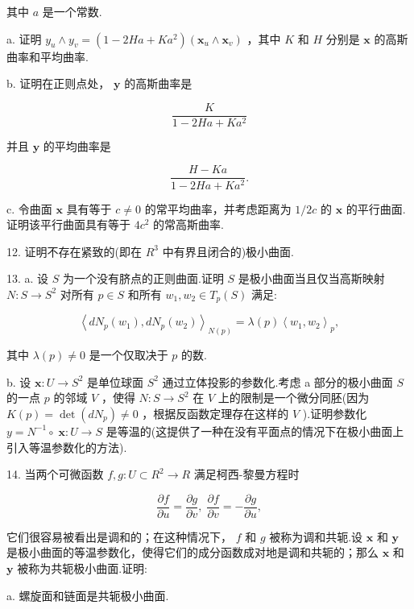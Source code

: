 其中 \(a\) 是一个常数.

a. 证明 \({y}_{u} \land  {y}_{v} = \left( {1 - {2Ha} + K{a}^{2}}\right) \left( {{\mathbf{x}}_{u} \land  {\mathbf{x}}_{v}}\right)\) ，其中 \(K\) 和 \(H\) 分别是 \(\mathbf{x}\) 的高斯曲率和平均曲率.

b. 证明在正则点处， \(\mathbf{y}\) 的高斯曲率是

\[
\frac{K}{1 - {2Ha} + K{a}^{2}}
\]

并且 \(\mathbf{y}\) 的平均曲率是

\[
\frac{H - {Ka}}{1 - {2Ha} + K{a}^{2}}.
\]

c. 令曲面 \(\mathbf{x}\) 具有等于 \(c \neq  0\) 的常平均曲率，并考虑距离为 \(1/{2c}\) 的 \(\mathbf{x}\) 的平行曲面.证明该平行曲面具有等于 \(4{c}^{2}\) 的常高斯曲率.

12. 证明不存在紧致的(即在 \({R}^{3}\) 中有界且闭合的)极小曲面.

13. a. 设 \(S\) 为一个没有脐点的正则曲面.证明 \(S\) 是极小曲面当且仅当高斯映射 \(N : S \rightarrow  {S}^{2}\) 对所有 \(p \in  S\) 和所有 \({w}_{1},{w}_{2} \in  {T}_{p}\left( S\right)\) 满足:

\[
{\left\langle  d{N}_{p}\left( {w}_{1}\right) ,d{N}_{p}\left( {w}_{2}\right) \right\rangle  }_{N\left( p\right) } = \lambda \left( p\right) {\left\langle  {w}_{1},{w}_{2}\right\rangle  }_{p},
\]

其中 \(\lambda \left( p\right)  \neq  0\) 是一个仅取决于 \(p\) 的数.

b. 设 \(\mathbf{x} : U \rightarrow  {S}^{2}\) 是单位球面 \({S}^{2}\) 通过立体投影的参数化.考虑 a 部分的极小曲面 \(S\) 的一点 \(p\) 的邻域 \(V\) ，使得 \(N : S \rightarrow  {S}^{2}\) 在 \(V\) 上的限制是一个微分同胚(因为 \(K\left( p\right)  = \det \left( {d{N}_{p}}\right)  \neq  0\) ，根据反函数定理存在这样的 \(V\) ).证明参数化 \(y = {N}^{-1} \circ \; \mathbf{x} : U \rightarrow  S\) 是等温的(这提供了一种在没有平面点的情况下在极小曲面上引入等温参数化的方法).

14. 当两个可微函数 \(f,g : U \subset  {R}^{2} \rightarrow  R\) 满足柯西-黎曼方程时

\[
\frac{\partial f}{\partial u} = \frac{\partial g}{\partial v},\;\frac{\partial f}{\partial v} =  - \frac{\partial g}{\partial u},
\]

它们很容易被看出是调和的；在这种情况下， \(f\) 和 \(g\) 被称为调和共轭.设 \(\mathbf{x}\) 和 \(\mathbf{y}\) 是极小曲面的等温参数化，使得它们的成分函数成对地是调和共轭的；那么 \(\mathbf{x}\) 和 \(\mathbf{y}\) 被称为共轭极小曲面.证明:

a. 螺旋面和链面是共轭极小曲面.

